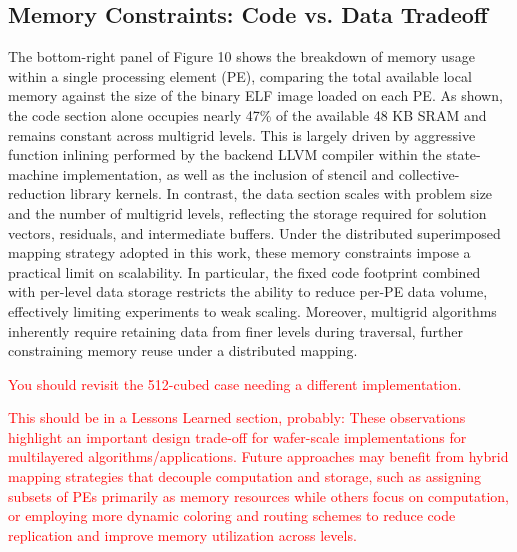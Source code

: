\documentclass[sigconf]{acmart}
\begin{document}
\subsection{Memory Constraints: Code vs. Data Tradeoff}
    The bottom-right panel of Figure 10 shows the breakdown of memory usage within a single processing element (PE), comparing the total available local memory against the size of the binary ELF image loaded on each PE. As shown, the code section alone occupies nearly 47\% of the available 48 KB SRAM and remains constant across multigrid levels. This is largely driven by aggressive function inlining performed by the backend LLVM compiler within the state-machine implementation, as well as the inclusion of stencil and collective-reduction library kernels. In contrast, the data section scales with problem size and the number of multigrid levels, reflecting the storage required for solution vectors, residuals, and intermediate buffers. Under the distributed superimposed mapping strategy adopted in this work, these memory constraints impose a practical limit on scalability. In particular, the fixed code footprint combined with per-level data storage restricts the ability to reduce per-PE data volume, effectively limiting experiments to weak scaling. Moreover, multigrid algorithms inherently require retaining data from finer levels during traversal, further constraining memory reuse under a distributed mapping.

\textcolor{red}{You should revisit the 512-cubed case needing a different implementation.}
    
    \textcolor{red}{This should be in a Lessons Learned section, probably: These observations highlight an important design trade-off for wafer-scale implementations for multilayered algorithms/applications. %
    Future approaches may benefit from hybrid mapping strategies that decouple computation and storage, such as assigning subsets of PEs primarily as memory resources while others focus on computation, or employing more dynamic coloring and routing schemes to reduce code replication and improve memory utilization across levels.}
\end{document}

